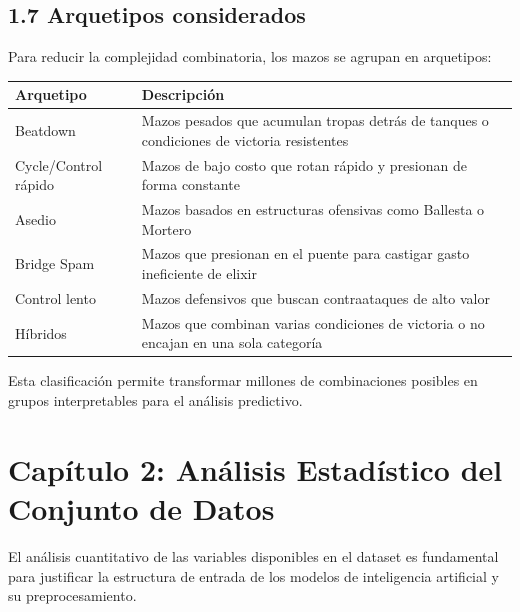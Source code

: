 \documentclass[
  spanish,
  12pt,
]{report}
\newcounter{none} %
\begin{document}
\section{1.7 Arquetipos considerados}\label{arquetipos-considerados}

Para reducir la complejidad combinatoria, los mazos se agrupan en
arquetipos:

{\def\LTcaptype{none} %
\begin{longtable}[]{@{}
  >{\raggedright\arraybackslash}p{}
  >{\raggedright\arraybackslash}p{}@{}}
\toprule\noalign{}
\begin{minipage}[b]{\linewidth}\raggedright
Arquetipo
\end{minipage} & \begin{minipage}[b]{\linewidth}\raggedright
Descripción
\end{minipage} \\
\midrule\noalign{}
\endhead
\bottomrule\noalign{}
\endlastfoot
Beatdown & Mazos pesados que acumulan tropas detrás de tanques o
condiciones de victoria resistentes \\
Cycle/Control rápido & Mazos de bajo costo que rotan rápido y presionan
de forma constante \\
Asedio & Mazos basados en estructuras ofensivas como Ballesta o
Mortero \\
Bridge Spam & Mazos que presionan en el puente para castigar gasto
ineficiente de elixir \\
Control lento & Mazos defensivos que buscan contraataques de alto
valor \\
Híbridos & Mazos que combinan varias condiciones de victoria o no
encajan en una sola categoría \\
\end{longtable}
}

Esta clasificación permite transformar millones de combinaciones
posibles en grupos interpretables para el análisis predictivo.

\chapter{Capítulo 2: Análisis Estadístico del Conjunto de
Datos}\label{capuxedtulo-2-anuxe1lisis-estaduxedstico-del-conjunto-de-datos}

El análisis cuantitativo de las variables disponibles en el dataset es
fundamental para justificar la estructura de entrada de los modelos de
inteligencia artificial y su preprocesamiento.
\end{document}
